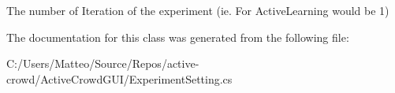 The number of Iteration of the experiment (ie. For Active\+Learning would be 1) 



The documentation for this class was generated from the following file\+:\begin{DoxyCompactItemize}
\item 
C\+:/\+Users/\+Matteo/\+Source/\+Repos/active-\/crowd/\+Active\+Crowd\+G\+U\+I/Experiment\+Setting.\+cs\end{DoxyCompactItemize}
